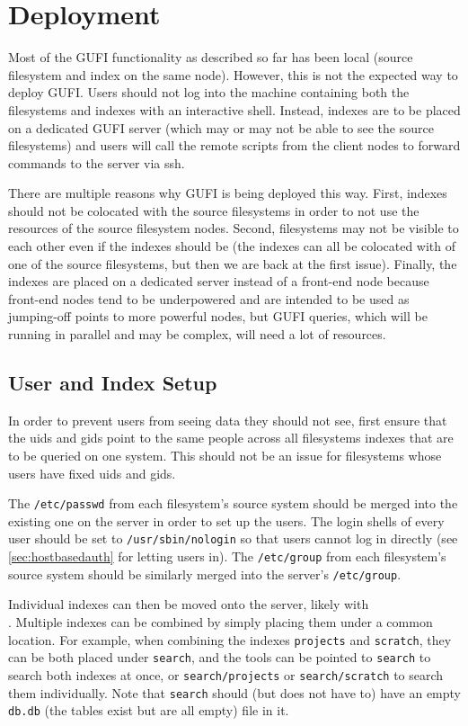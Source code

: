 \section{Deployment}
\label{sec:deploy}
Most of the GUFI functionality as described so far has been local
(source filesystem and index on the same node). However, this is not
the expected way to deploy GUFI. Users should not log into the machine
containing both the filesystems and indexes with an interactive
shell. Instead, indexes are to be placed on a dedicated GUFI server
(which may or may not be able to see the source filesystems) and users
will call the remote scripts from the client nodes to forward commands
to the server via ssh.

There are multiple reasons why GUFI is being deployed this way. First,
indexes should not be colocated with the source filesystems in order
to not use the resources of the source filesystem nodes. Second,
filesystems may not be visible to each other even if the indexes
should be (the indexes can all be colocated with of one of the source
filesystems, but then we are back at the first issue). Finally, the
indexes are placed on a dedicated server instead of a front-end node
because front-end nodes tend to be underpowered and are intended to be
used as jumping-off points to more powerful nodes, but GUFI queries,
which will be running in parallel and may be complex, will need a lot
of resources.

\subsection{User and Index Setup}
In order to prevent users from seeing data they should not see, first
ensure that the uids and gids point to the same people across all
filesystems indexes that are to be queried on one system. This should
not be an issue for filesystems whose users have fixed uids and gids.

The \texttt{/etc/passwd} from each filesystem's source system should
be merged into the existing one on the server in order to set up
the users. The login shells of every user should be set to
\texttt{/usr/sbin/nologin} so that users cannot log in directly (see
\ref{sec:hostbasedauth} for letting users in). The \texttt{/etc/group}
from each filesystem's source system should be similarly merged into
the server's \texttt{/etc/group}.

Individual indexes can then be moved onto the server, likely with
\\\gufitraceindex. Multiple indexes can be combined by simply placing
them under a common location. For example, when combining the indexes
\texttt{projects} and \texttt{scratch}, they can be both placed under
\texttt{search}, and the tools can be pointed to \texttt{search} to
search both indexes at once, or \texttt{search/projects} or
\texttt{search/scratch} to search them individually. Note that
\texttt{search} should (but does not have to) have an empty
\texttt{db.db} (the tables exist but are all empty) file in it.

